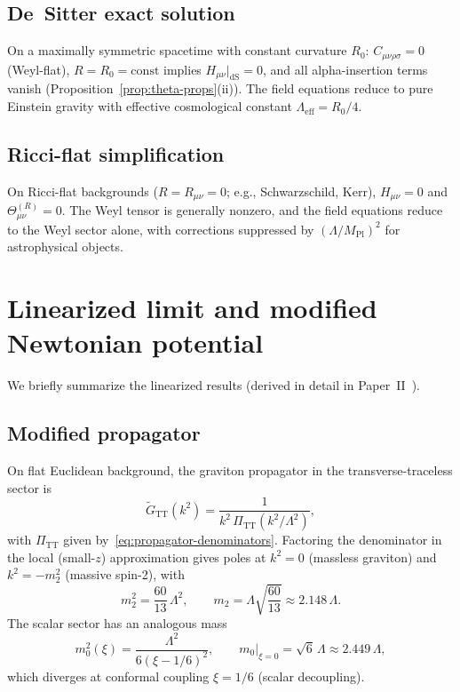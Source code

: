 \documentclass[12pt,a4paper]{article}
\newcommand{\PiTT}{\Pi_{\mathrm{TT}}}
\newcommand{\Lam}{\Lambda}
\theoremstyle{plain}
\theoremstyle{definition}
\begin{document}
\subsection{De~Sitter exact solution}

On a maximally symmetric spacetime with constant curvature $R_0$:
$C_{\mu\nu\rho\sigma} = 0$ (Weyl-flat), $R = R_0 = \mathrm{const}$ implies
$H_{\mu\nu}|_{\mathrm{dS}} = 0$, and all alpha-insertion terms vanish
(Proposition~\ref{prop:theta-props}(ii)).  The field equations reduce to
pure Einstein gravity with effective cosmological constant
$\Lam_{\mathrm{eff}} = R_0/4$.

\subsection{Ricci-flat simplification}

On Ricci-flat backgrounds ($R = R_{\mu\nu} = 0$; e.g., Schwarzschild, Kerr),
$H_{\mu\nu} = 0$ and $\Theta^{(R)}_{\mu\nu} = 0$.  The Weyl tensor is
generally nonzero, and the field equations reduce to the Weyl sector alone,
with corrections suppressed by $(\Lam/M_{\mathrm{Pl}})^2$ for
astrophysical objects.

\section{Linearized limit and modified Newtonian potential}
\label{sec:linearized}

We briefly summarize the linearized results (derived in detail in
Paper~II~\cite{Alfyorov:2026ss}).

\subsection{Modified propagator}

On flat Euclidean background, the graviton propagator in the
transverse-traceless sector is
\begin{equation}\label{eq:GF-TT}
  \tilde{G}_{\mathrm{TT}}(k^2)
  = \frac{1}{k^2\,\PiTT(k^2/\Lam^2)},
\end{equation}
with $\PiTT$ given by~\eqref{eq:propagator-denominators}.  Factoring the
denominator in the local (small-$z$) approximation gives poles at
$k^2 = 0$ (massless graviton) and $k^2 = -m_2^2$ (massive spin-2),
with
\begin{equation}\label{eq:m2}
  m_2^2 = \frac{60}{13}\,\Lam^2,
  \qquad m_2 = \Lam\sqrt{\frac{60}{13}} \approx 2.148\,\Lam.
\end{equation}
The scalar sector has an analogous mass
\begin{equation}\label{eq:m0}
  m_0^2(\xi) = \frac{\Lam^2}{6(\xi - 1/6)^2},
  \qquad m_0\big|_{\xi=0} = \sqrt{6}\,\Lam \approx 2.449\,\Lam,
\end{equation}
which diverges at conformal coupling $\xi = 1/6$ (scalar decoupling).
\end{document}
